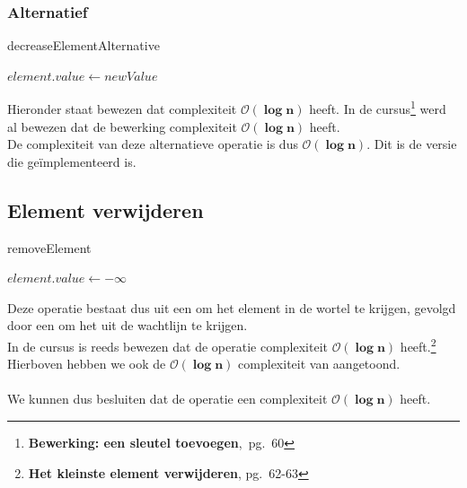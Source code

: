 \documentclass[a4paper,12pt]{report}
\newcommand{\bigO}[1]{$\bm{\mathcal{O}(#1)}$} %
\begin{document}
\subsubsection{Alternatief}
\begin{algorithm}[H]
\caption{decreaseElementAlternative}
\SetAlgoLined	
\DontPrintSemicolon
{}\;
$element.value \gets newValue$\;
\;
\end{algorithm}
Hieronder staat bewezen dat  complexiteit \bigO{\log n} heeft. In de cursus\footnote{\textbf{Bewerking: een sleutel toevoegen},~pg.~60} werd al bewezen dat de  bewerking complexiteit \bigO{\log n} heeft. \\
De complexiteit van deze alternatieve operatie is dus \bigO{\log n}. Dit is de versie die ge\"implementeerd is.

\subsection{Element verwijderen}
\begin{algorithm}[H]
\caption{removeElement}
\SetAlgoLined	
\DontPrintSemicolon
$element.value \gets -\infty$\;
\;
\;
\end{algorithm}
Deze operatie bestaat dus uit een  om het element in de wortel te krijgen, gevolgd door een  om het uit de wachtlijn te krijgen. \\
In de cursus is reeds bewezen dat de  operatie complexiteit \bigO{\log n} heeft.\footnote{\textbf{Het kleinste element verwijderen}, pg.~62-63} \\
Hierboven hebben we ook de \bigO{\log n} complexiteit van  aangetoond. \\ \\
We kunnen dus besluiten dat de  operatie een complexiteit \bigO{\log n} heeft.
\end{document}
